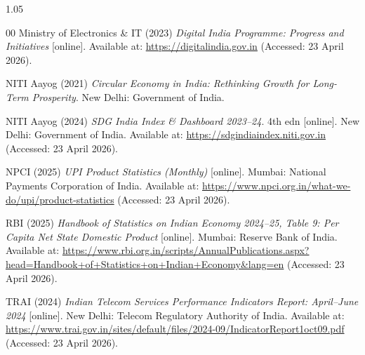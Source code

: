 \documentclass[10pt,a4paper]{article}
\begin{document}
\begin{spacing}{1.05}
\begin{thebibliography}{00}
Ministry of Electronics \& IT (2023) \textit{Digital India Programme: Progress and Initiatives} [online]. Available at: \url{https://digitalindia.gov.in} (Accessed: 23 April 2026).

NITI Aayog (2021) \textit{Circular Economy in India: Rethinking Growth for Long-Term Prosperity}. New Delhi: Government of India.

NITI Aayog (2024) \textit{SDG India Index \& Dashboard 2023--24}. 4th edn [online]. New Delhi: Government of India. Available at: \url{https://sdgindiaindex.niti.gov.in} (Accessed: 23 April 2026).

NPCI (2025) \textit{UPI Product Statistics (Monthly)} [online]. Mumbai: National Payments Corporation of India. Available at: \url{https://www.npci.org.in/what-we-do/upi/product-statistics} (Accessed: 23 April 2026).

RBI (2025) \textit{Handbook of Statistics on Indian Economy 2024--25, Table 9: Per Capita Net State Domestic Product} [online]. Mumbai: Reserve Bank of India. Available at: \url{https://www.rbi.org.in/scripts/AnnualPublications.aspx?head=Handbook+of+Statistics+on+Indian+Economy&lang=en} (Accessed: 23 April 2026).

TRAI (2024) \textit{Indian Telecom Services Performance Indicators Report: April--June 2024} [online]. New Delhi: Telecom Regulatory Authority of India. Available at: \url{https://www.trai.gov.in/sites/default/files/2024-09/IndicatorReport1oct09.pdf} (Accessed: 23 April 2026).

\end{thebibliography}
\end{spacing}
\end{document}
